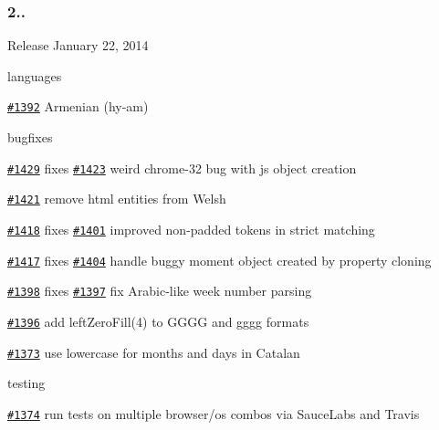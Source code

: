 \subsubsection*{2..}


\begin{DoxyItemize}
\item Release January 22, 2014
\item languages
\begin{DoxyItemize}
\item \href{https://github.com/moment/moment/issues/1392}{\tt \#1392} Armenian (hy-\/am)
\end{DoxyItemize}
\item bugfixes
\begin{DoxyItemize}
\item \href{https://github.com/moment/moment/issues/1429}{\tt \#1429} fixes \href{https://github.com/moment/moment/issues/1423}{\tt \#1423} weird chrome-\/32 bug with js object creation
\item \href{https://github.com/moment/moment/issues/1421}{\tt \#1421} remove html entities from Welsh
\item \href{https://github.com/moment/moment/issues/1418}{\tt \#1418} fixes \href{https://github.com/moment/moment/issues/1401}{\tt \#1401} improved non-\/padded tokens in strict matching
\item \href{https://github.com/moment/moment/issues/1417}{\tt \#1417} fixes \href{https://github.com/moment/moment/issues/1404}{\tt \#1404} handle buggy moment object created by property cloning
\item \href{https://github.com/moment/moment/issues/1398}{\tt \#1398} fixes \href{https://github.com/moment/moment/issues/1397}{\tt \#1397} fix Arabic-\/like week number parsing
\item \href{https://github.com/moment/moment/issues/1396}{\tt \#1396} add left\+Zero\+Fill(4) to G\+G\+GG and gggg formats
\item \href{https://github.com/moment/moment/issues/1373}{\tt \#1373} use lowercase for months and days in Catalan
\end{DoxyItemize}
\item testing
\begin{DoxyItemize}
\item \href{https://github.com/moment/moment/issues/1374}{\tt \#1374} run tests on multiple browser/os combos via Sauce\+Labs and Travis
\end{DoxyItemize}
\end{DoxyItemize}

